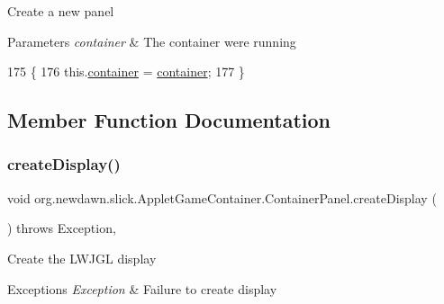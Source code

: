 Create a new panel


\begin{DoxyParams}{Parameters}
{\em container} & The container we\textquotesingle{}re running \\
\hline
\end{DoxyParams}

\begin{DoxyCode}
175                                                  \{
176          this.\mbox{\hyperlink{classorg_1_1newdawn_1_1slick_1_1_applet_game_container_1_1_container_panel_a205433c30651024b8b0ba19894a080f6}{container}} = \mbox{\hyperlink{classorg_1_1newdawn_1_1slick_1_1_applet_game_container_1_1_container_panel_a205433c30651024b8b0ba19894a080f6}{container}};
177       \}
\end{DoxyCode}


\subsection{Member Function Documentation}
\mbox{\label{classorg_1_1newdawn_1_1slick_1_1_applet_game_container_1_1_container_panel_a4b7aa4a0a37d31b1391e1d254fe0e693}} 
\subsubsection{\texorpdfstring{create\+Display()}{createDisplay()}}
{\footnotesize\ttfamily void org.\+newdawn.\+slick.\+Applet\+Game\+Container.\+Container\+Panel.\+create\+Display (\begin{DoxyParamCaption}{ }\end{DoxyParamCaption}) throws Exception\hspace{0.3cm}{\ttfamily [inline]}, {\ttfamily [private]}}

Create the L\+W\+J\+GL display


\begin{DoxyExceptions}{Exceptions}
{\em Exception} & Failure to create display \\
\hline
\end{DoxyExceptions}

